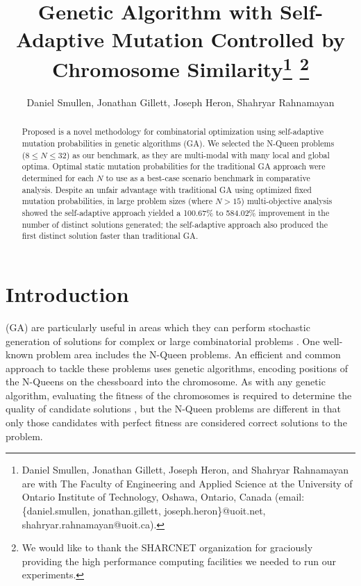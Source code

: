 \documentclass[conference]{IEEEtran}
\begin{document}
\title{\ \\ \LARGE\bf Genetic Algorithm with Self-Adaptive Mutation Controlled by Chromosome Similarity\thanks{Daniel Smullen, Jonathan Gillett, Joseph Heron, and Shahryar Rahnamayan are with The Faculty of Engineering and Applied Science at the University of Ontario Institute of Technology, Oshawa, Ontario, Canada (email: \{daniel.smullen, jonathan.gillett, joseph.heron\}@uoit.net, shahryar.rahnamayan@uoit.ca).} \thanks{We would like to thank the SHARCNET organization for graciously providing the high performance computing facilities we needed to run our experiments.}}

\author{Daniel Smullen, Jonathan Gillett, Joseph Heron, Shahryar Rahnamayan}


\maketitle

\begin{abstract}
Proposed is a novel methodology for combinatorial optimization using self-adaptive mutation probabilities in genetic algorithms (GA). We selected the N-Queen problems ($8 \leq N \leq 32$) as our benchmark, as they are multi-modal with many local and global optima. Optimal static mutation probabilities for the traditional GA approach were determined for each $N$ to use as a best-case scenario benchmark in comparative analysis. Despite an unfair advantage with traditional GA using optimized fixed mutation probabilities, in large problem sizes (where $N > 15$) multi-objective analysis showed the self-adaptive approach yielded a 100.67\% to 584.02\% improvement in the number of distinct solutions generated; the self-adaptive approach also produced the first distinct solution faster than traditional GA.
\end{abstract}


\section{Introduction}
 (GA) are particularly useful in areas which they can perform stochastic generation of solutions for complex or large combinatorial problems \cite{de1989using,crawford1992solving}. One well-known problem area includes the N-Queen problems. An efficient and common approach to tackle these problems uses genetic algorithms, encoding positions of the N-Queens on the chessboard into the chromosome. As with any genetic algorithm, evaluating the fitness of the chromosomes is required to determine the quality of candidate solutions \cite{srinivas1994genetic}, but the N-Queen problems are different in that only those candidates with perfect fitness are considered correct solutions to the problem. 
\end{document}
